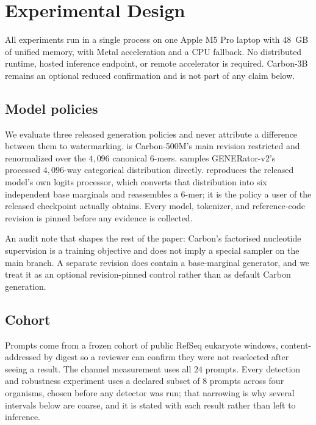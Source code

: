 \section{Experimental Design}

All experiments run in a single process on one Apple M5 Pro laptop with 48~GB of unified memory, with
Metal acceleration and a CPU fallback. No distributed runtime, hosted inference endpoint, or remote
accelerator is required. Carbon-3B remains an optional reduced confirmation and is not part of any
claim below.

\subsection{Model policies}

We evaluate three released generation policies and never attribute a difference between them to
watermarking. \policyCtok{} is Carbon-500M's main revision restricted and renormalized over the
$4{,}096$ canonical 6-mers. \policyGtok{} samples GENERator-v2's processed $4{,}096$-way categorical
distribution directly. \policyGbp{} reproduces the released model's own logits processor, which
converts that distribution into six independent base marginals and reassembles a 6-mer; it is the
policy a user of the released checkpoint actually obtains. Every model, tokenizer, and reference-code
revision is pinned before any evidence is collected.

An audit note that shapes the rest of the paper: Carbon's factorised nucleotide supervision is a
training objective and does not imply a special sampler on the main branch. A separate revision does
contain a base-marginal generator, and we treat it as an optional revision-pinned control rather than
as default Carbon generation.

\subsection{Cohort}

Prompts come from a frozen cohort of public RefSeq eukaryote windows, content-addressed by digest so a
reviewer can confirm they were not reselected after seeing a result. The channel measurement uses all
$24$ prompts. Every detection and robustness experiment uses a declared subset of $8$ prompts across
four organisms, chosen before any detector was run; that narrowing is why several intervals below are
coarse, and it is stated with each result rather than left to inference.

